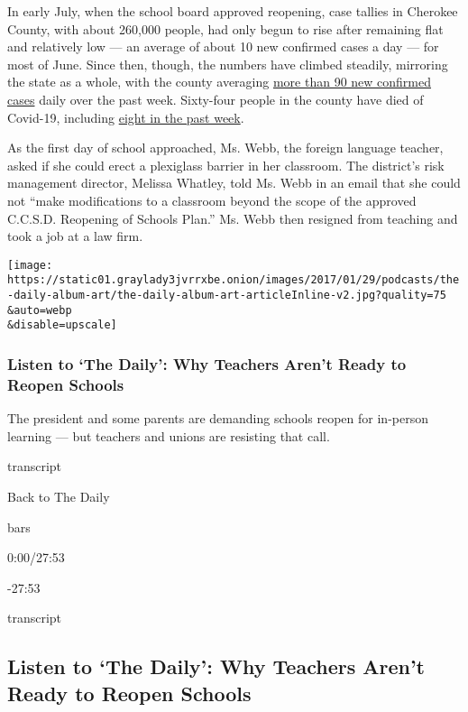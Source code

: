 In early July, when the school board approved reopening, case tallies in
Cherokee County, with about 260,000 people, had only begun to rise after
remaining flat and relatively low --- an average of about 10 new
confirmed cases a day --- for most of June. Since then, though, the
numbers have climbed steadily, mirroring the state as a whole, with the
county averaging
\href{https://www.nytimes3xbfgragh.onion/interactive/2020/us/georgia-coronavirus-cases.html\#county}{more
than 90 new confirmed cases} daily over the past week. Sixty-four people
in the county have died of Covid-19, including
\href{https://www.nytimes3xbfgragh.onion/interactive/2020/us/georgia-coronavirus-cases.html\#county}{eight
in the past week}.

As the first day of school approached, Ms. Webb, the foreign language
teacher, asked if she could erect a plexiglass barrier in her classroom.
The district's risk management director, Melissa Whatley, told Ms. Webb
in an email that she could not ``make modifications to a classroom
beyond the scope of the approved C.C.S.D. Reopening of Schools Plan.''
Ms. Webb then resigned from teaching and took a job at a law firm.

\texttt{[image: https://static01.graylady3jvrrxbe.onion/images/2017/01/29/podcasts/the-daily-album-art/the-daily-album-art-articleInline-v2.jpg?quality=75\\\&auto=webp\\\&disable=upscale]}

\hypertarget{listen-to-the-daily-why-teachers-arent-ready-to-reopen-schools}{%
\subsubsection{Listen to `The Daily': Why Teachers Aren't Ready to
Reopen
Schools}\label{listen-to-the-daily-why-teachers-arent-ready-to-reopen-schools}}

The president and some parents are demanding schools reopen for
in-person learning --- but teachers and unions are resisting that call.

transcript

Back to The Daily

bars

0:00/27:53

-27:53

transcript

\hypertarget{listen-to-the-daily-why-teachers-arent-ready-to-reopen-schools-1}{%
\subsection{Listen to `The Daily': Why Teachers Aren't Ready to Reopen
Schools}\label{listen-to-the-daily-why-teachers-arent-ready-to-reopen-schools-1}}


